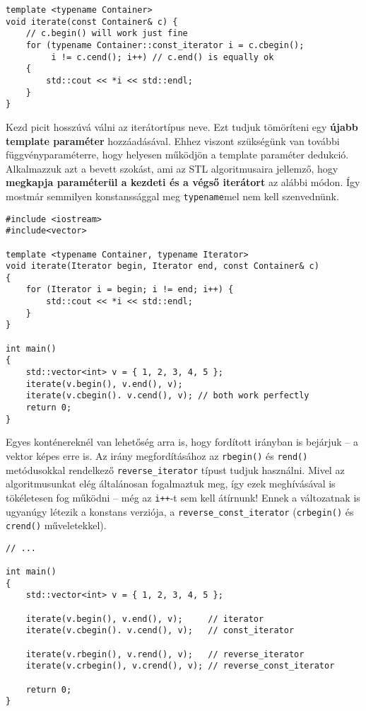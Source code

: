 \documentclass[a4paper, 11pt, oneside]{book}
\begin{document}
\begin{lstlisting}[style=cppstyle]
template <typename Container>
void iterate(const Container& c) {
	// c.begin() will work just fine
	for (typename Container::const_iterator i = c.cbegin(); 
		 i != c.cend(); i++) // c.end() is equally ok
	{
		std::cout << *i << std::endl;
	}
}
\end{lstlisting}

Kezd picit hosszúvá válni az iterátortípus neve. Ezt tudjuk tömöríteni egy \textbf{újabb template paraméter} hozzáadásával. Ehhez viszont szükségünk van további függvényparaméterre, hogy helyesen működjön a template paraméter dedukció. Alkalmazzuk azt a bevett szokást, ami az STL algoritmusaira jellemző, hogy \textbf{megkapja paraméterül a kezdeti és a végső iterátort} az alábbi módon. Így mostmár semmilyen konstanssággal meg \verb*|typename|mel nem kell szenvednünk.

\begin{lstlisting}[style=cppstyle]
#include <iostream>
#include<vector>

template <typename Container, typename Iterator>
void iterate(Iterator begin, Iterator end, const Container& c) 
{
	for (Iterator i = begin; i != end; i++) {
		std::cout << *i << std::endl;
	}
}

int main() 
{
	std::vector<int> v = { 1, 2, 3, 4, 5 };
	iterate(v.begin(), v.end(), v);
	iterate(v.cbegin(). v.cend(), v); // both work perfectly
	return 0;
}
\end{lstlisting}


Egyes konténereknél van lehetőség arra is, hogy fordított irányban is bejárjuk -- a vektor képes erre is. Az irány megfordításához az \verb*|rbegin()| és \verb*|rend()| metódusokkal rendelkező \verb*|reverse_iterator| típust tudjuk használni. Mivel az algoritmusunkat elég általánosan fogalmaztuk meg, így ezek meghívásával is tökéletesen fog működni -- még az \verb*|i++|-t sem kell átírnunk! Ennek a változatnak is ugyanúgy létezik a konstans verziója, a \verb*|reverse_const_iterator| (\verb*|crbegin()| és \verb*|crend()| műveletekkel).

\begin{lstlisting}[style=cppstyle]
// ...

int main() 
{
	std::vector<int> v = { 1, 2, 3, 4, 5 };
	
	iterate(v.begin(), v.end(), v);		// iterator
	iterate(v.cbegin(). v.cend(), v); 	// const_iterator
	
	iterate(v.rbegin(), v.rend(), v);	// reverse_iterator
	iterate(v.crbegin(), v.crend(), v);	// reverse_const_iterator
	
	return 0;
}
\end{lstlisting}
\end{document}
